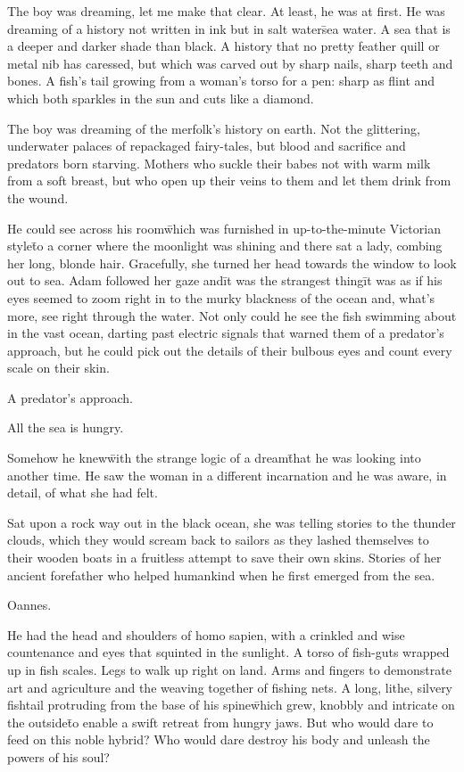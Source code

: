 


\prelude

The boy was dreaming, let me make that clear. At least, he was at
first. He was dreaming of a history not written in ink but in salt
water\=sea water. A sea that is a deeper and darker shade than
black. A history that no pretty feather quill or metal nib has
caressed, but which was carved out by sharp nails, sharp teeth and
bones. A fish’s tail growing from a woman’s torso for a pen: sharp as
flint and which both sparkles in the sun and cuts like a diamond.

The boy was dreaming of the merfolk’s history on earth. Not the
glittering, underwater palaces of repackaged fairy-tales, but blood
and sacrifice and predators born starving. Mothers who suckle their
babes not with warm milk from a soft breast, but who open up their
veins to them and let them drink from the wound.

He could see across his room\=which was furnished in up-to-the-minute
Victorian style\=to a corner where the moonlight was shining and there
sat a lady, combing her long, blonde hair. Gracefully, she turned her
head towards the window to look out to sea. Adam followed her gaze
and\=it was the strangest thing\=it was as if his eyes seemed to zoom
right in to the murky blackness of the ocean and, what’s more, see
right through the water. Not only could he see the fish swimming about
in the vast ocean, darting past electric signals that warned them of a
predator’s approach, but he could pick out the details of their
bulbous eyes and count every scale on their skin.

A predator’s approach.

All the sea is hungry.

Somehow he knew\=with the strange logic of a dream\=that he was
looking into another time. He saw the woman in a different incarnation
and he was aware, in detail, of what she had felt.

Sat upon a rock way out in the black ocean, she was telling stories to
the thunder clouds, which they would scream back to sailors as they
lashed themselves to their wooden boats in a fruitless attempt to save
their own skins. Stories of her ancient forefather who helped
humankind when he first emerged from the sea.

Oannes.

He had the head and shoulders of homo sapien, with a crinkled and wise
countenance and eyes that squinted in the sunlight. A torso of
fish-guts wrapped up in fish scales. Legs to walk up right on
land. Arms and fingers to demonstrate art and agriculture and the
weaving together of fishing nets. A long, lithe, silvery fishtail
protruding from the base of his spine\=which grew, knobbly and
intricate on the outside\=to enable a swift retreat from hungry
jaws. But who would dare to feed on this noble hybrid? Who would dare
destroy his body and unleash the powers of his soul?

